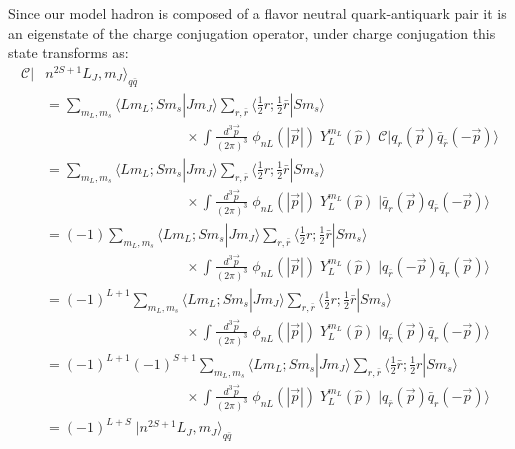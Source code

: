 Since our model hadron is composed of a flavor neutral quark-antiquark pair it is an eigenstate of the charge conjugation operator, under charge conjugation this state transforms as:
\begin{align*}
\mathcal{C}| &n^{2S+1}L_J , m_J \rangle_{q\bar{q}} \\
&=   \sum_{m_L, m_s} \langle L m_L; S m_s | J m_J \rangle \sum_{r,\bar{r}} \langle \tfrac{1}{2}  r; \tfrac{1}{2} \bar{r} | S m_s \rangle \\ &\qquad\qquad\qquad\qquad\qquad\times \int  \frac{d^3\vec{p}}{(2\pi)^3}  \;\phi_{nL}( | \vec{p}|) \; Y_{L}^{m_L}(\hat{p}) \; \mathcal{C}|q_{r}(\vec{p}) \bar{q}_{\bar{r}}(-\vec{p}) \rangle  \\
 &=   \sum_{m_L, m_s} \langle L m_L; S m_s | J m_J \rangle \sum_{r,\bar{r}} \langle \tfrac{1}{2}  r; \tfrac{1}{2} \bar{r} | S m_s \rangle \\ &\qquad\qquad\qquad\qquad\qquad\times\int  \frac{d^3\vec{p}}{(2\pi)^3}  \;\phi_{nL}( | \vec{p}|) \; Y_{L}^{m_L}(\hat{p}) \; |\bar{q}_{r}(\vec{p}) q_{\bar{r}}(-\vec{p}) \rangle  \\
 &=  (-1) \sum_{m_L, m_s} \langle L m_L; S m_s | J m_J \rangle \sum_{r,\bar{r}} \langle \tfrac{1}{2}  r; \tfrac{1}{2} \bar{r} | S m_s \rangle  \\ &\qquad\qquad\qquad\qquad\qquad\times\int  \frac{d^3\vec{p}}{(2\pi)^3}  \;\phi_{nL}( | \vec{p}|) \; Y_{L}^{m_L}(\hat{p}) \; | q_{\bar{r}}(-\vec{p}) \bar{q}_{r}(\vec{p}) \rangle  \\
  &=  (-1)^{L+1} \sum_{m_L, m_s} \langle L m_L; S m_s | J m_J \rangle \sum_{r,\bar{r}} \langle \tfrac{1}{2}  r; \tfrac{1}{2} \bar{r} | S m_s \rangle  \\ &\qquad\qquad\qquad\qquad\qquad\times\int  \frac{d^3\vec{p}}{(2\pi)^3}  \;\phi_{nL}( | \vec{p}|) \; Y_{L}^{m_L}(\hat{p}) \; | q_{\bar{r}}(\vec{p}) \bar{q}_{r}(-\vec{p}) \rangle  \\
   &=  (-1)^{L+1}(-1)^{S+1} \sum_{m_L, m_s} \langle L m_L; S m_s | J m_J \rangle \sum_{r,\bar{r}} \langle \tfrac{1}{2}  \bar{r}; \tfrac{1}{2} r | S m_s \rangle  \\ &\qquad\qquad\qquad\qquad\qquad\times\int  \frac{d^3\vec{p}}{(2\pi)^3}  \;\phi_{nL}( | \vec{p}|) \; Y_{L}^{m_L}(\hat{p}) \; | q_{\bar{r}}(\vec{p}) \bar{q}_{r}(-\vec{p}) \rangle  \\
   &= (-1)^{L+S} \; | n^{2S+1} L_J , m_J \rangle_{q\bar{q}}
\end{align*}

